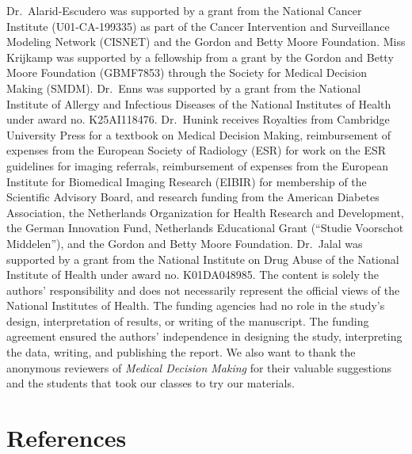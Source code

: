 \documentclass[
]{article}
\begin{document}
Dr.~Alarid-Escudero was supported by a grant from the National Cancer Institute (U01-CA-199335) as part of the Cancer Intervention and Surveillance Modeling Network (CISNET) and the Gordon and Betty Moore Foundation. Miss Krijkamp was supported by a fellowship from a grant by the Gordon and Betty Moore Foundation (GBMF7853) through the Society for Medical Decision Making (SMDM). Dr.~Enns was supported by a grant from the National Institute of Allergy and Infectious Diseases of the National Institutes of Health under award no. K25AI118476. Dr.~Hunink receives Royalties from Cambridge University Press for a textbook on Medical Decision Making, reimbursement of expenses from the European Society of Radiology (ESR) for work on the ESR guidelines for imaging referrals, reimbursement of expenses from the European Institute for Biomedical Imaging Research (EIBIR) for membership of the Scientific Advisory Board, and research funding from the American Diabetes Association, the Netherlands Organization for Health Research and Development, the German Innovation Fund, Netherlands Educational Grant (``Studie Voorschot Middelen''), and the Gordon and Betty Moore Foundation. Dr.~Jalal was supported by a grant from the National Institute on Drug Abuse of the National Institute of Health under award no. K01DA048985. The content is solely the authors' responsibility and does not necessarily represent the official views of the National Institutes of Health. The funding agencies had no role in the study's design, interpretation of results, or writing of the manuscript. The funding agreement ensured the authors' independence in designing the study, interpreting the data, writing, and publishing the report. We also want to thank the anonymous reviewers of \emph{Medical Decision Making} for their valuable suggestions and the students that took our classes to try our materials.

\hypertarget{references}{%
\section*{References}\label{references}}
\end{document}
